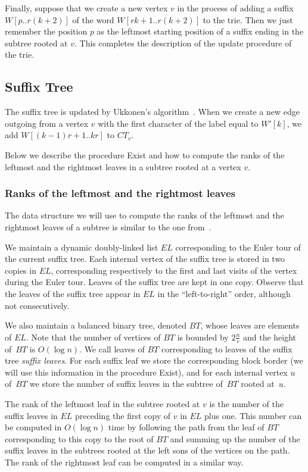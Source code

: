 \documentclass[10pt]{llncs}
\newcommand{\exist}{{\sc Exist}}
\begin{document}
Finally, suppose that we create a new vertex $v$ in the process of adding a suffix $W[p..r(k+2)]$ of the word $W[rk+1..r(k+2)]$ to the trie. Then we just remember the position $p$ as the leftmost starting position of a suffix ending in the subtree rooted at $v$. This completes the description of the update procedure of the trie.

\subsection{Suffix Tree}
The suffix tree is updated by Ukkonen's algorithm~\cite{ukkonen:on-line}. When we create a new edge outgoing from a vertex $v$ with the first character of the label equal to $W'[k]$, we add $W[(k-1)r+1..kr]$ to $CT_v$.

Below we describe the procedure \exist{} and how to compute the ranks of the leftmost and the rightmost leaves in a subtree rooted at a vertex $v$.

\subsubsection{Ranks of the leftmost and the rightmost leaves}
The data structure we will use to compute the ranks of the leftmost and the rightmost leaves of a subtree is similar to the one from~\cite{KNS12}.

We maintain a dynamic doubly-linked list $EL$ corresponding to the Euler tour of the current suffix tree. Each internal vertex of the suffix tree is stored in two copies in $EL$, corresponding respectively to the first and last visits of the vertex during the Euler tour. Leaves of the suffix tree are kept in one copy. Observe that the leaves of the suffix tree appear in $EL$ in the ``left-to-right'' order, although not consecutively.

We also maintain a balanced binary tree, denoted $BT$, whose leaves are elements of $EL$. Note that the number of vertices of $BT$ is bounded by $2\frac{n}{r}$ and the height of~$BT$ is $O(\log n)$. We call leaves of $BT$ corresponding to leaves of the suffix tree {\em suffix leaves}. For each suffix leaf we store the corresponding block border (we will use this information in the procedure \exist{}), and for each internal vertex $u$ of~$BT$ we store the number of suffix leaves in the subtree of~$BT$ rooted at~$u$.

The rank of the leftmost leaf in the subtree rooted at $v$ is the number of the suffix leaves in $EL$ preceding the first copy of $v$ in $EL$ plus one. This number can be computed in $O(\log{n})$ time by following the path from the leaf of $BT$ corresponding to this copy to the root of $BT$ and summing up the number of the suffix leaves in the subtrees rooted at the left sons of the vertices on the path. The rank of the rightmost leaf can be computed in a similar way.
\end{document}
